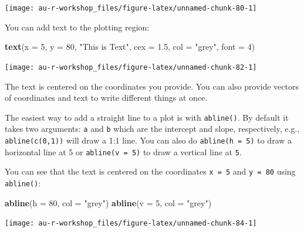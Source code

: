 \documentclass[]{book}
\newenvironment{Shaded}{\begin{snugshade}}{\end{snugshade}}
\newcommand{\KeywordTok}[1]{\textcolor[rgb]{0.13,0.29,0.53}{\textbf{#1}}}
\newcommand{\DataTypeTok}[1]{\textcolor[rgb]{0.13,0.29,0.53}{#1}}
\newcommand{\DecValTok}[1]{\textcolor[rgb]{0.00,0.00,0.81}{#1}}
\newcommand{\FloatTok}[1]{\textcolor[rgb]{0.00,0.00,0.81}{#1}}
\newcommand{\StringTok}[1]{\textcolor[rgb]{0.31,0.60,0.02}{#1}}
\newcommand{\NormalTok}[1]{#1}
\theoremstyle{definition}
\theoremstyle{definition}
\theoremstyle{definition}
\theoremstyle{remark}
\begin{document}
\begin{center}\texttt{[image: au-r-workshop\_files/figure-latex/unnamed-chunk-80-1]} \end{center}

You can add text to the plotting region:

\begin{Shaded}
\begin{Highlighting}[]
\KeywordTok{text}\NormalTok{(}\DataTypeTok{x =} \DecValTok{5}\NormalTok{, }\DataTypeTok{y =} \DecValTok{80}\NormalTok{, }\StringTok{"This is Text"}\NormalTok{, }\DataTypeTok{cex =} \FloatTok{1.5}\NormalTok{, }\DataTypeTok{col =} \StringTok{"grey"}\NormalTok{, }\DataTypeTok{font =} \DecValTok{4}\NormalTok{)}
\end{Highlighting}
\end{Shaded}

\begin{center}\texttt{[image: au-r-workshop\_files/figure-latex/unnamed-chunk-82-1]} \end{center}

The text is centered on the coordinates you provide. You can also
provide vectors of coordinates and text to write different things at
once.

The easiest way to add a straight line to a plot is with
\texttt{abline()}. By default it takes two arguments: \texttt{a} and
\texttt{b} which are the intercept and slope, respectively, e.g.,
\texttt{abline(c(0,1))} will draw a 1:1 line. You can also do
\texttt{abline(h\ =\ 5)} to draw a horizontal line at 5 or
\texttt{abline(v\ =\ 5)} to draw a vertical line at \texttt{5}.

You can see that the text is centered on the coordinates
\texttt{x\ =\ 5} and \texttt{y\ =\ 80} using \texttt{abline()}:

\begin{Shaded}
\begin{Highlighting}[]
\KeywordTok{abline}\NormalTok{(}\DataTypeTok{h =} \DecValTok{80}\NormalTok{, }\DataTypeTok{col =} \StringTok{"grey"}\NormalTok{)}
\KeywordTok{abline}\NormalTok{(}\DataTypeTok{v =} \DecValTok{5}\NormalTok{, }\DataTypeTok{col =} \StringTok{"grey"}\NormalTok{)}
\end{Highlighting}
\end{Shaded}

\begin{center}\texttt{[image: au-r-workshop\_files/figure-latex/unnamed-chunk-84-1]} \end{center}
\end{document}
